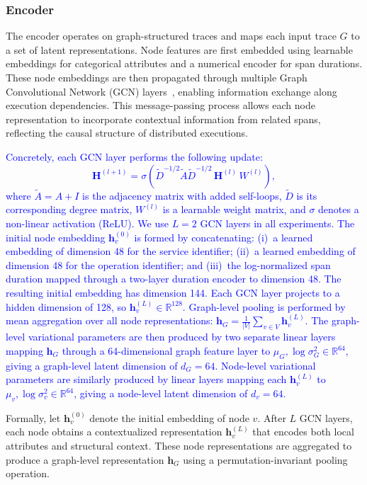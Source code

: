 \documentclass[sigconf,review]{acmart}
\begin{document}
\subsubsection{Encoder}

The encoder operates on graph-structured traces and maps each input trace $G$ to a set of latent representations. Node features are first embedded using learnable embeddings for categorical attributes and a numerical encoder for span durations. These node embeddings are then propagated through multiple Graph Convolutional Network (GCN) layers~\cite{kipf2016semi}, enabling information exchange along execution dependencies. This message-passing process allows each node representation to incorporate contextual information from related spans, reflecting the causal structure of distributed executions.

\textcolor{blue}{Concretely, each GCN layer performs the following update:
\[
\mathbf{H}^{(l+1)} = \sigma\!\left(\tilde{D}^{-1/2}\tilde{A}\tilde{D}^{-1/2}\,\mathbf{H}^{(l)}\,W^{(l)}\right),
\]
where $\tilde{A} = A + I$ is the adjacency matrix with added self-loops, $\tilde{D}$ is its corresponding degree matrix, $W^{(l)}$ is a learnable weight matrix, and $\sigma$ denotes a non-linear activation (ReLU). We use $L = 2$ GCN layers in all experiments. The initial node embedding $\mathbf{h}_v^{(0)}$ is formed by concatenating: (i)~a learned embedding of dimension 48 for the service identifier; (ii)~a learned embedding of dimension 48 for the operation identifier; and (iii)~the log-normalized span duration mapped through a two-layer duration encoder to dimension 48. The resulting initial embedding has dimension 144. Each GCN layer projects to a hidden dimension of 128, so $\mathbf{h}_v^{(L)} \in \mathbb{R}^{128}$. Graph-level pooling is performed by mean aggregation over all node representations: $\mathbf{h}_G = \frac{1}{|V|}\sum_{v\in V}\mathbf{h}_v^{(L)}$. The graph-level variational parameters are then produced by two separate linear layers mapping $\mathbf{h}_G$ through a 64-dimensional graph feature layer to $\mu_G, \log\sigma_G^2 \in \mathbb{R}^{64}$, giving a graph-level latent dimension of $d_G = 64$. Node-level variational parameters are similarly produced by linear layers mapping each $\mathbf{h}_v^{(L)}$ to $\mu_v, \log\sigma_v^2 \in \mathbb{R}^{64}$, giving a node-level latent dimension of $d_v = 64$.}

Formally, let $\mathbf{h}_v^{(0)}$ denote the initial embedding of node $v$. After $L$ GCN layers, each node obtains a contextualized representation $\mathbf{h}_v^{(L)}$ that encodes both local attributes and structural context. These node representations are aggregated to produce a graph-level representation $\mathbf{h}_G$ using a permutation-invariant pooling operation.
\end{document}
